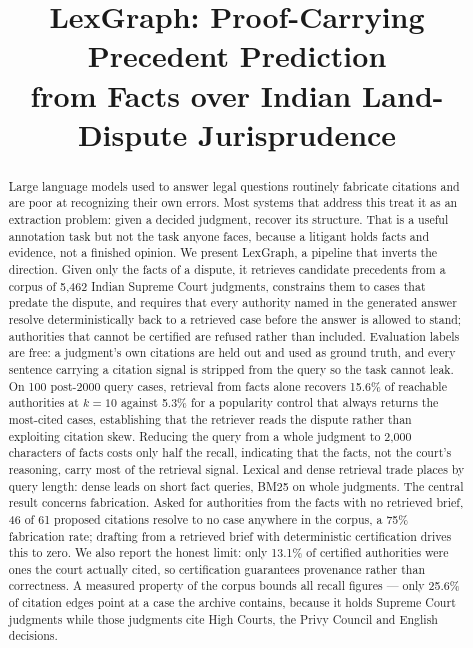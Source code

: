 \documentclass[10pt,conference]{IEEEtran}
\begin{document}
\title{LexGraph: Proof-Carrying Precedent Prediction\\from Facts over Indian Land-Dispute Jurisprudence}

\author{
\IEEEauthorblockN{[Member 1], [Member 2], [Member 3], [Member 4]}
}

\maketitle

\begin{abstract}
Large language models used to answer legal questions routinely fabricate citations and are
poor at recognizing their own errors. Most systems that address this treat it as an
extraction problem: given a decided judgment, recover its structure. That is a useful
annotation task but not the task anyone faces, because a litigant holds facts and evidence,
not a finished opinion. We present LexGraph, a pipeline that inverts the direction. Given
only the facts of a dispute, it retrieves candidate precedents from a corpus of 5{,}462
Indian Supreme Court judgments, constrains them to cases that predate the dispute, and
requires that every authority named in the generated answer resolve deterministically back
to a retrieved case before the answer is allowed to stand; authorities that cannot be
certified are refused rather than included. Evaluation labels are free: a judgment's own
citations are held out and used as ground truth, and every sentence carrying a citation
signal is stripped from the query so the task cannot leak. On 100 post-2000 query cases,
retrieval from facts alone recovers 15.6\% of reachable authorities at $k{=}10$ against
5.3\% for a popularity control that always returns the most-cited cases, establishing that
the retriever reads the dispute rather than exploiting citation skew. Reducing the query
from a whole judgment to 2{,}000 characters of facts costs only half the recall, indicating
that the facts, not the court's reasoning, carry most of the retrieval signal. Lexical and
dense retrieval trade places by query length: dense leads on short fact queries, BM25 on
whole judgments. The central result concerns fabrication. Asked for authorities from the
facts with no retrieved brief, 46 of 61 proposed citations resolve to no case anywhere in
the corpus, a 75\% fabrication rate; drafting from a retrieved brief with deterministic
certification drives this to zero. We also report the honest limit: only 13.1\% of
certified authorities were ones the court actually cited, so certification guarantees
provenance rather than correctness. A measured property of the corpus bounds all recall
figures --- only 25.6\% of citation edges point at a case the archive contains, because it
holds Supreme Court judgments while those judgments cite High Courts, the Privy Council and
English decisions.
\end{abstract}
\end{document}
